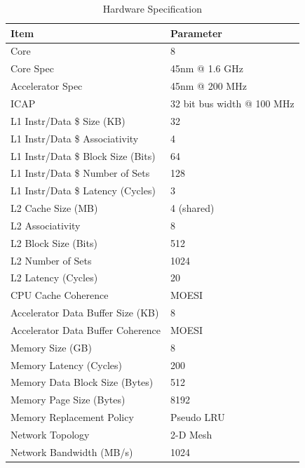 \begin{table}
\scriptsize
\begin{center}
  \begin{tabular} { | l | l | }
    \hline
    \textbf{Item} & \textbf{Parameter} \\
    \hline
    \hline
	Core & 8 \\
	\hline
	Core Spec & 45nm @ 1.6 GHz \\
	\hline
	Accelerator Spec & 45nm @ 200 MHz \\
	\hline
	ICAP & 32 bit bus width @ 100 MHz \\
	\hline
	L1 Instr/Data \$ Size (KB) & 32 \\
	\hline
    L1 Instr/Data \$ Associativity & 4\\
    \hline
    L1 Instr/Data \$ Block Size (Bits) & 64\\
    \hline
    L1 Instr/Data \$ Number of Sets & 128\\
    \hline
    L1 Instr/Data \$ Latency (Cycles) & 3 \\
   	\hline
   	L2 Cache Size (MB) & 4 (shared) \\
   	\hline
    L2 Associativity & 8\\
    \hline
    L2 Block Size (Bits) & 512\\
    \hline
    L2 Number of Sets & 1024 \\
    \hline
    L2 Latency (Cycles) & 20\\
    \hline
    CPU Cache Coherence & MOESI\\
    \hline
    Accelerator Data Buffer Size (KB) & 8 \\
    \hline
    Accelerator Data Buffer Coherence & MOESI\\
    \hline
    Memory Size (GB) & 8 \\
    \hline
    Memory Latency (Cycles) & 200 \\
    \hline
    Memory Data Block Size (Bytes) & 512\\
    \hline
    Memory Page Size (Bytes) & 8192\\
    \hline
    Memory Replacement Policy & Pseudo LRU\\
    \hline
    Network Topology & 2-D Mesh\\
    \hline
    Network Bandwidth (MB/s) & 1024\\
    \hline
  \end{tabular}
\caption{Hardware Specification}
\label{tbl_parameters}
\end{center}
\end{table}



